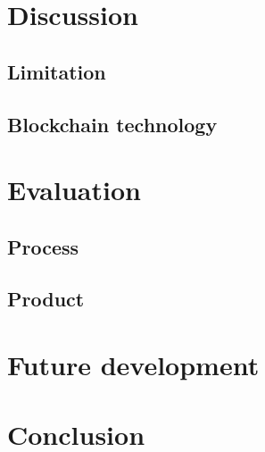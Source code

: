 \documentclass[12pt]{article}
\begin{document}
\section{Discussion}
\subsection{Limitation}

\subsection{Blockchain technology}

\section{Evaluation}
\subsection{Process}

\subsection{Product}

\section{Future development}

\section{Conclusion}




\end{document}

